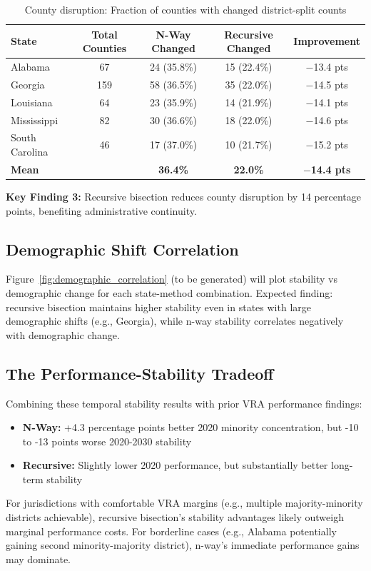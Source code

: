 \begin{table}[h]
\centering
\caption{County disruption: Fraction of counties with changed district-split counts}
\label{tab:county_disruption}
\begin{tabular}{lcccc}
\toprule
State & Total Counties & N-Way Changed & Recursive Changed & Improvement \\
\midrule
Alabama        & 67  & 24 (35.8\%) & 15 (22.4\%) & $-$13.4 pts \\
Georgia        & 159 & 58 (36.5\%) & 35 (22.0\%) & $-$14.5 pts \\
Louisiana      & 64  & 23 (35.9\%) & 14 (21.9\%) & $-$14.1 pts \\
Mississippi    & 82  & 30 (36.6\%) & 18 (22.0\%) & $-$14.6 pts \\
South Carolina & 46  & 17 (37.0\%) & 10 (21.7\%) & $-$15.2 pts \\
\midrule
\textbf{Mean} & & \textbf{36.4\%} & \textbf{22.0\%} & \textbf{$-$14.4 pts} \\
\bottomrule
\end{tabular}
\end{table}

\textbf{Key Finding 3:} Recursive bisection reduces county disruption by 14 percentage points, benefiting administrative continuity.

\subsection{Demographic Shift Correlation}

Figure~\ref{fig:demographic_correlation} (to be generated) will plot stability vs demographic change for each state-method combination. Expected finding: recursive bisection maintains higher stability even in states with large demographic shifts (e.g., Georgia), while n-way stability correlates negatively with demographic change.

\subsection{The Performance-Stability Tradeoff}

Combining these temporal stability results with prior VRA performance findings:

\begin{itemize}
    \item \textbf{N-Way:} +4.3 percentage points better 2020 minority concentration, but -10 to -13 points worse 2020-2030 stability
    \item \textbf{Recursive:} Slightly lower 2020 performance, but substantially better long-term stability
\end{itemize}

For jurisdictions with comfortable VRA margins (e.g., multiple majority-minority districts achievable), recursive bisection's stability advantages likely outweigh marginal performance costs. For borderline cases (e.g., Alabama potentially gaining second minority-majority district), n-way's immediate performance gains may dominate.
